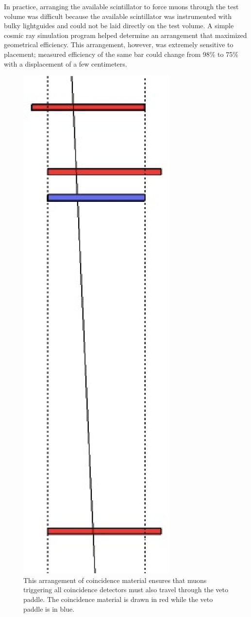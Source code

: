 In practice, arranging the available scintillator to force muons through the test volume was difficult because the available scintillator was instrumented with bulky lightguides and could not be laid directly on the test volume.  A simple cosmic ray simulation program helped determine an arrangement that maximized geometrical efficiency.  This arrangement, however, was extremely sensitive to placement; measured efficiency of the same bar could change from 98\% to 75\% with a displacement of a few centimeters.
\begin{figure}[htp]
\centering
\includegraphics[height=0.4\textheight]{figures/veto_test_layout.eps}
\caption{This arrangement of coincidence material ensures that muons triggering all coincidence detectors must also travel through the veto paddle.  The coincidence material is drawn in red while the veto paddle is in blue.}
\label{fig:efficiencyTest}
\end{figure}

